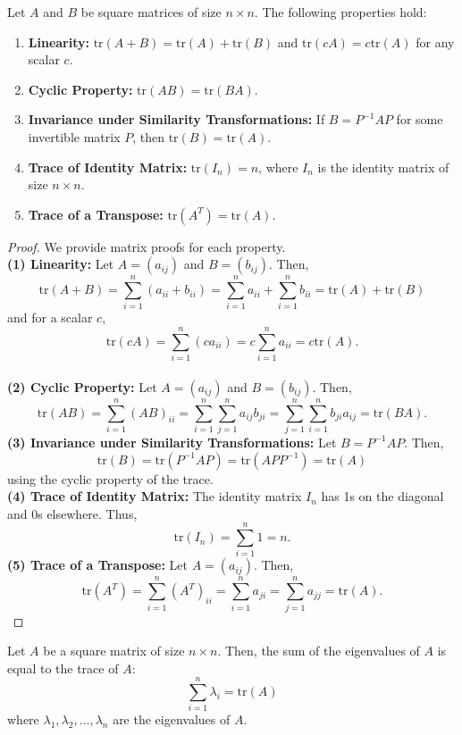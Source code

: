 \documentclass[openany]{book}
\begin{document}
\begin{mytheorem}
Let $A$ and $B$ be square matrices of size $n \times n$. The following properties hold:
\begin{enumerate}
    \item \textbf{Linearity:} $\text{tr}(A + B) = \text{tr}(A) + \text{tr}(B)$ and $\text{tr}(cA) = c\text{tr}(A)$ for any scalar $c$.
    \item \textbf{Cyclic Property:} $\text{tr}(AB) = \text{tr}(BA)$.
    \item \textbf{Invariance under Similarity Transformations:} If $B = P^{-1}AP$ for some invertible matrix $P$, then $\text{tr}(B) = \text{tr}(A)$.
    \item \textbf{Trace of Identity Matrix:} $\text{tr}(I_n) = n$, where $I_n$ is the identity matrix of size $n \times n$.
    \item \textbf{Trace of a Transpose:} $\text{tr}(A^T) = \text{tr}(A)$.
\end{enumerate}
\end{mytheorem}
\begin{proof}
    We provide matrix proofs for each property. \\
    \textbf{(1) Linearity:} Let $A = (a_{ij})$ and $B = (b_{ij})$. Then,
    \[
    \text{tr}(A + B) = \sum_{i=1}^{n} (a_{ii} + b_{ii}) = \sum_{i=1}^{n} a_{ii} + \sum_{i=1}^{n} b_{ii} = \text{tr}(A) + \text{tr}(B)
    \]
    and for a scalar $c$,
    \[
    \text{tr}(cA) = \sum_{i=1}^{n} (ca_{ii}) = c\sum_{i=1}^{n} a_{ii} = c\text{tr}(A).
    \] \\
    \textbf{(2) Cyclic Property:} Let $A = (a_{ij})$ and $B = (b_{ij})$. Then, 
    \[\text{tr}(AB) = \sum_{i=1}^{n} (AB)_{ii} = \sum_{i=1}^{n} \sum_{j=1}^{n} a_{ij}b_{ji} = \sum_{j=1}^{n} \sum_{i=1}^{n} b_{ji}a_{ij} = \text{tr}(BA).\]
    \textbf{(3) Invariance under Similarity Transformations:} Let $B = P^{-1}AP$. Then,
    \[\text{tr}(B) = \text{tr}(P^{-1}AP) = \text{tr}(AP P^{-1}) = \text{tr}(A)\]
    using the cyclic property of the trace. \\
    \textbf{(4) Trace of Identity Matrix:} The identity matrix $I_n$ has 1s on the diagonal and 0s elsewhere. Thus,
    \[\text{tr}(I_n) = \sum_{i=1}^{n} 1 = n.\]
    \textbf{(5) Trace of a Transpose:} Let $A = (a_{ij})$. Then,
    \[\text{tr}(A^T) = \sum_{i=1}^{n} (A^T)_{ii} = \sum_{i=1}^{n} a_{ji} = \sum_{j=1}^{n} a_{jj} = \text{tr}(A).\]
\end{proof}
\begin{mytheorem}
Let $A$ be a square matrix of size $n \times n$. Then, the sum of the eigenvalues of $A$ is equal to the trace of $A$:
\[\sum_{i=1}^{n} \lambda_i = \text{tr}(A)\]
where $\lambda_1, \lambda_2, \ldots, \lambda_n$ are the eigenvalues of $A$.
\end{mytheorem}
\end{document}
